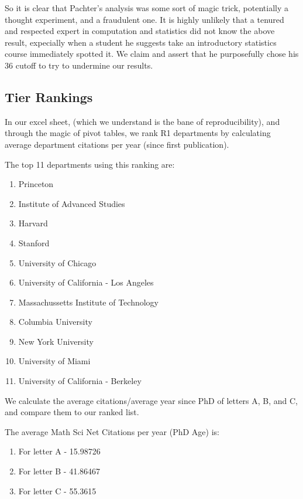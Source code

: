 \documentclass[]{article}
\begin{document}
So it is clear that Pachter's analysis was some sort of magic trick,
potentially a thought experiment, and a fraudulent one. It is highly
unlikely that a tenured and respected expert in computation and
statistics did not know the above result, expecially when a student he
suggests take an introductory statistics course immediately spotted it.
We claim and assert that he purposefully chose his 36 cutoff to try to
undermine our results.

\hypertarget{tier-rankings}{%
\subsection{Tier Rankings}\label{tier-rankings}}

In our excel sheet, (which we understand is the bane of
reproducibility), and through the magic of pivot tables, we rank R1
departments by calculating average department citations per year (since
first publication).

The top 11 departments using this ranking are:

\begin{enumerate}
\def\labelenumi{\arabic{enumi}.}
\item
  Princeton
\item
  Institute of Advanced Studies
\item
  Harvard
\item
  Stanford
\item
  University of Chicago
\item
  University of California - Los Angeles
\item
  Massachussetts Institute of Technology
\item
  Columbia University
\item
  New York University
\item
  University of Miami
\item
  University of California - Berkeley
\end{enumerate}

We calculate the average citations/average year since PhD of letters A,
B, and C, and compare them to our ranked list.

The average Math Sci Net Citations per year (PhD Age) is:

\begin{enumerate}
\def\labelenumi{\arabic{enumi}.}
\item
  For letter A - 15.98726
\item
  For letter B - 41.86467
\item
  For letter C - 55.3615
\end{enumerate}
\end{document}
